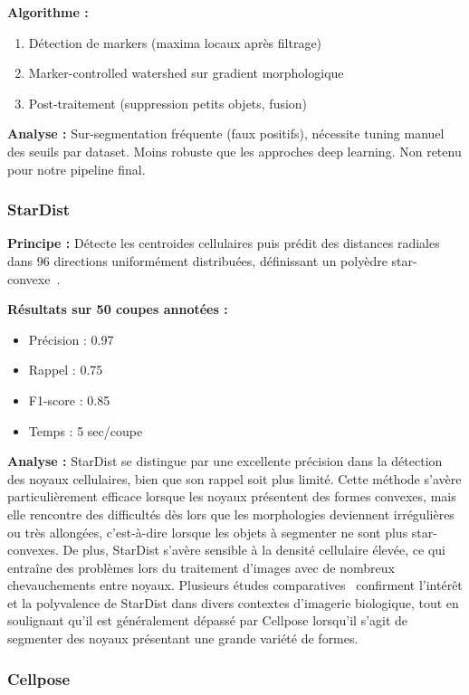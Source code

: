 \textbf{Algorithme :}
\begin{enumerate}
    \item Détection de markers (maxima locaux après filtrage)
    \item Marker-controlled watershed sur gradient morphologique
    \item Post-traitement (suppression petits objets, fusion)
\end{enumerate}

\textbf{Analyse :}
Sur-segmentation fréquente (faux positifs), nécessite tuning manuel des seuils par dataset. Moins robuste que les approches deep learning. Non retenu pour notre pipeline final.

\subsubsection{StarDist}

\textbf{Principe :}
Détecte les centroides cellulaires puis prédit des distances radiales dans 96 directions uniformément distribuées, définissant un polyèdre star-convexe~\cite{Schmidt2018}.

\textbf{Résultats sur 50 coupes annotées :}
\begin{itemize}
    \item Précision : 0.97
    \item Rappel : 0.75
    \item F1-score : 0.85
    \item Temps : 5 sec/coupe
\end{itemize}

\textbf{Analyse :}
StarDist se distingue par une excellente précision dans la détection des noyaux cellulaires, bien que son rappel soit plus limité. Cette méthode s’avère particulièrement efficace lorsque les noyaux présentent des formes convexes, mais elle rencontre des difficultés dès lors que les morphologies deviennent irrégulières ou très allongées, c’est-à-dire lorsque les objets à segmenter ne sont plus star-convexes. De plus, StarDist s’avère sensible à la densité cellulaire élevée, ce qui entraîne des problèmes lors du traitement d’images avec de nombreux chevauchements entre noyaux. Plusieurs études comparatives~\cite{Weigert2022,Kleinberg2022} confirment l’intérêt et la polyvalence de StarDist dans divers contextes d’imagerie biologique, tout en soulignant qu’il est généralement dépassé par Cellpose lorsqu’il s’agit de segmenter des noyaux présentant une grande variété de formes.

\subsubsection{Cellpose}

